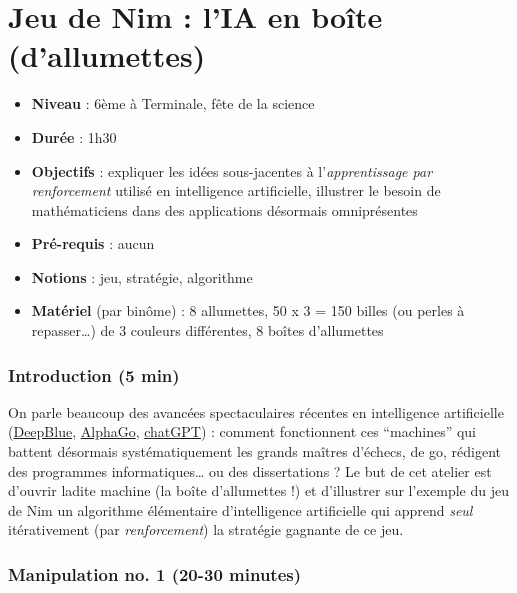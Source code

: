 \hypertarget{jeu-de-nim-lia-en-bouxeete-dallumettes}{%
\section{Jeu de Nim : l'IA en boîte
(d'allumettes)}\label{jeu-de-nim-lia-en-bouxeete-dallumettes}}

\begin{itemize}
\tightlist
\item
  \textbf{Niveau} : 6ème à Terminale, fête de la science
\item
  \textbf{Durée} : 1h30
\item
  \textbf{Objectifs} : expliquer les idées sous-jacentes à
  l'\emph{apprentissage par renforcement} utilisé en intelligence
  artificielle, illustrer le besoin de mathématiciens dans des
  applications désormais omniprésentes
\item
  \textbf{Pré-requis} : aucun
\item
  \textbf{Notions} : jeu, stratégie, algorithme
\item
  \textbf{Matériel} (par binôme) : 8 allumettes, 50 x 3 = 150 billes (ou
  perles à repasser\ldots) de 3 couleurs différentes, 8 boîtes
  d'allumettes
\end{itemize}

\hypertarget{introduction-5-min}{%
\subsubsection{Introduction (5 min)}\label{introduction-5-min}}

On parle beaucoup des avancées spectaculaires récentes en intelligence
artificielle
(\href{https://www.ibm.com/ibm/history/ibm100/us/en/icons/deepblue}{DeepBlue},
\href{https://www.deepmind.com/research/highlighted-research}{AlphaGo},
\href{https://openai.com/blog/chatgpt}{chatGPT}) : comment fonctionnent
ces ``machines'' qui battent désormais systématiquement les grands
maîtres d'échecs, de go, rédigent des programmes informatiques\ldots{}
ou des dissertations ? Le but de cet atelier est d'ouvrir ladite machine
(la boîte d'allumettes !) et d'illustrer sur l'exemple du jeu de Nim un
algorithme élémentaire d'intelligence artificielle qui apprend
\emph{seul} itérativement (par \emph{renforcement}) la stratégie
gagnante de ce jeu.

\hypertarget{manipulation-no.-1-20-30-minutes}{%
\subsubsection{Manipulation no. 1 (20-30
minutes)}\label{manipulation-no.-1-20-30-minutes}}

